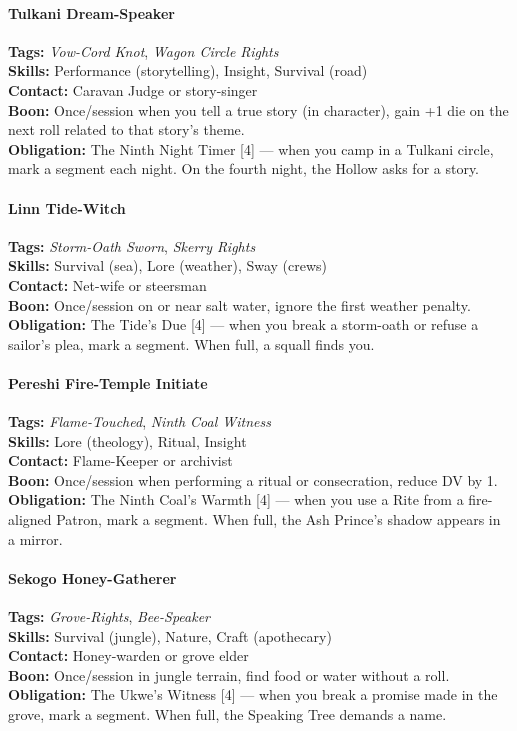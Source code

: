 \paragraph{Tulkani Dream-Speaker}
\textbf{Tags:} \textit{Vow-Cord Knot}, \textit{Wagon Circle Rights} \\
\textbf{Skills:} Performance (storytelling), Insight, Survival (road) \\
\textbf{Contact:} Caravan Judge or story-singer \\
\textbf{Boon:} Once/session when you tell a true story (in character), gain +1 die on the next roll related to that story's theme. \\
\textbf{Obligation:} The Ninth Night Timer [4] --- when you camp in a Tulkani circle, mark a segment each night. On the fourth night, the Hollow asks for a story.

\paragraph{Linn Tide-Witch}
\textbf{Tags:} \textit{Storm-Oath Sworn}, \textit{Skerry Rights} \\
\textbf{Skills:} Survival (sea), Lore (weather), Sway (crews) \\
\textbf{Contact:} Net-wife or steersman \\
\textbf{Boon:} Once/session on or near salt water, ignore the first weather penalty. \\
\textbf{Obligation:} The Tide's Due [4] --- when you break a storm-oath or refuse a sailor's plea, mark a segment. When full, a squall finds you.

\paragraph{Pereshi Fire-Temple Initiate}
\textbf{Tags:} \textit{Flame-Touched}, \textit{Ninth Coal Witness} \\
\textbf{Skills:} Lore (theology), Ritual, Insight \\
\textbf{Contact:} Flame-Keeper or archivist \\
\textbf{Boon:} Once/session when performing a ritual or consecration, reduce DV by 1. \\
\textbf{Obligation:} The Ninth Coal's Warmth [4] --- when you use a Rite from a fire-aligned Patron, mark a segment. When full, the Ash Prince's shadow appears in a mirror.

\paragraph{Sekogo Honey-Gatherer}
\textbf{Tags:} \textit{Grove-Rights}, \textit{Bee-Speaker} \\
\textbf{Skills:} Survival (jungle), Nature, Craft (apothecary) \\
\textbf{Contact:} Honey-warden or grove elder \\
\textbf{Boon:} Once/session in jungle terrain, find food or water without a roll. \\
\textbf{Obligation:} The Ukwe's Witness [4] --- when you break a promise made in the grove, mark a segment. When full, the Speaking Tree demands a name.

